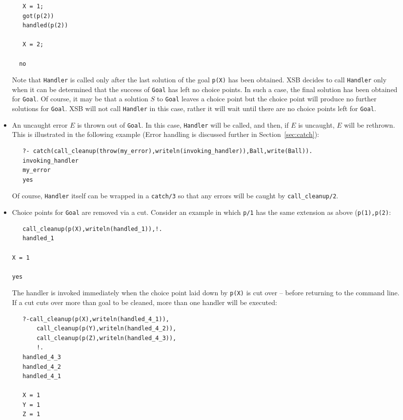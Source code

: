 \begin{description}
\begin{itemize}
\begin{verbatim}
   X = 1;
   got(p(2))
   handled(p(2))

   X = 2;

  no
\end{verbatim}
Note that {\tt Handler} is called only after the last solution of the
goal {\tt p(X)} has been obtained.  XSB decides to call {\tt Handler}
only when it can be determined that the success of {\tt Goal} has left
no choice points.  In such a case, the final solution has been
obtained for {\tt Goal}.  Of course, it may be that a solution $S$ to
{\tt Goal} leaves a choice point but the choice point will produce no
further solutions for {\tt Goal}.  XSB will not call {\tt Handler} in
this case, rather it will wait until there are no choice points left
for {\tt Goal}.

\item An uncaught error $E$ is thrown out of {\tt Goal}.  In this
  case, {\tt Handler} will be called, and then, if $E$ is uncaught,
  $E$ will be rethrown.  This is illustrated in the following example
  (Error handling is discussed further in Section~\ref{sec:catch}):
\begin{verbatim}
   ?- catch(call_cleanup(throw(my_error),writeln(invoking_handler)),Ball,write(Ball)).
   invoking_handler
   my_error
   yes
\end{verbatim}
Of course, {\tt Handler} itself can be wrapped in a {\tt catch/3} so
that any errors will be caught by {\tt call\_cleanup/2}.

\item Choice points for {\tt Goal} are removed via a cut.  Consider an
  example in which {\tt p/1} has the same extension as above ({\tt p(1),p(2)}:
\begin{verbatim}
   call_cleanup(p(X),writeln(handled_1)),!.
   handled_1

X = 1

yes	
\end{verbatim}
The handler is invoked immediately when the choice point laid down by
{\tt p(X)} is cut over -- before returning to the command line.  If a
cut cuts over more than goal to be cleaned, more than one handler will be executed:
\begin{verbatim}
   ?-call_cleanup(p(X),writeln(handled_4_1)),
       call_cleanup(p(Y),writeln(handled_4_2)),
       call_cleanup(p(Z),writeln(handled_4_3)),
       !.
   handled_4_3
   handled_4_2
   handled_4_1
 
   X = 1
   Y = 1
   Z = 1
\end{verbatim}
\end{itemize}


\end{description}
